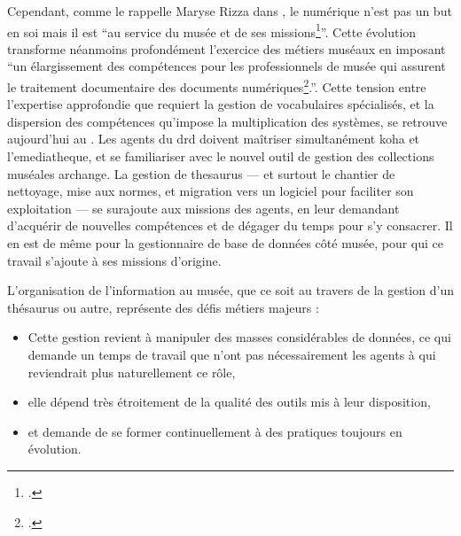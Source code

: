 Cependant, comme le rappelle Maryse Rizza dans , le numérique n’est pas un but en soi mais il est \enquote{au service du musée et de ses missions\footcite{ricardRGPDArchives2018a}}. Cette évolution transforme néanmoins profondément l’exercice des métiers muséaux en imposant \enquote{un élargissement des compétences pour les professionnels de musée qui assurent le traitement documentaire des documents numériques\footcite{rizzaDocumentAuCoeur2014}.}. Cette tension entre l’expertise approfondie que requiert la gestion de vocabulaires spécialisés, et la dispersion des compétences qu’impose la multiplication des systèmes, se retrouve aujourd’hui au \mae. Les agents du \ac{drd} doivent maîtriser simultanément \gls{koha} et l’\gls{emediatheque}, et se familiariser avec le nouvel outil de gestion des collections muséales \gls{archange}. La gestion de \gls{thesaurus} — et surtout le chantier de nettoyage, mise aux normes, et migration vers un logiciel pour faciliter son exploitation — se surajoute aux missions des agents, en leur demandant d’acquérir de nouvelles compétences et de dégager du temps pour s’y consacrer. Il en est de même pour la gestionnaire de base de données côté musée, pour qui ce travail s’ajoute à ses missions d’origine.

L’organisation de l’information au musée, que ce soit au travers de la gestion d’un thésaurus ou autre, représente des défis métiers majeurs :
\begin{itemize}
	\item Cette gestion revient à manipuler des masses considérables de données, ce qui demande un temps de travail que n’ont pas nécessairement les agents à qui reviendrait plus naturellement ce rôle,
	\item elle dépend très étroitement de la qualité des outils mis à leur disposition,
	\item et demande de se former continuellement à des pratiques toujours en évolution.
\end{itemize}